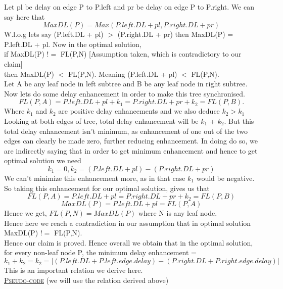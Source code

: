 \documentclass[a4 paper]{article}
\begin{document}
Let pl be delay on edge P to P.left and pr be delay on edge P to P.right. We can say here that $$MaxDL(P) = Max(P.left.DL + pl, P.right.DL + pr)$$ 
W.l.o.g lets say (P.left.DL + pl) $>$ (P.right.DL + pr) then MaxDL(P) = P.left.DL + pl. Now in the optimal solution, \\if MaxDL(P) $!=$ FL(P,N) [Assumption taken, which is contradictory to our claim]\\ then MaxDL(P) $<$ FL(P,N). Meaning (P.left.DL + pl) $<$ FL(P,N).\\
Let A be any leaf node in left subtree and B be any leaf node in right subtree. Now lets do some delay enhancement in order to make this tree synchronised. $$FL(P,A) = P.left.DL + pl + k_{1} = P.right.DL + pr + k_{2} = FL(P,B).$$ Where $k_{1}$ and $k_{2}$ are positive delay enhancements and we also deduce $k_{2} > k_{1}$\\
\newpage
{}
Looking at both edges of tree, total delay enhancement will be $k_{1}$ + $k_{2}$. But this total delay enhancement isn't minimum, as enhancement of one out of the two edges can clearly be made zero, further reducing enhancement. In doing do so, we are indirectly saying that in order to get minimum enhancement and hence to get optimal solution we need $$k_{1}= 0,k_{2} = (P.left.DL+pl)-(P.right.DL+pr)$$ We can't minimize this enhancement more, as in that case $k_{1}$ would be negative. So taking this enhancement for our optimal solution, gives us that $$FL(P,A) = P.left.DL + pl = P.right.DL + pr + k_{2} = FL(P,B)$$ $$MaxDL(P) = P.left.DL + pl = FL(P,A)$$ Hence we get, $FL(P,N) = MaxDL(P)$ where N is any leaf node.\\ Hence here we reach a contradiction in our assumption that in optimal solution MaxDL(P) $!=$ FL(P,N).\\
Hence our claim is proved. Hence overall we obtain that in the optimal solution, for every non-leaf node P, the minimum delay enhancement = $k_{1} + k_{2} = k_{2} = |(P.lef t.DL+P.left.edge.delay)-(P.right.DL+P.right.edge.delay)|$ This is an important relation we derive here.\\
\underline{\textsc{Pseudo-code}} (we will use the relation derived above)\\\\
\end{document}
